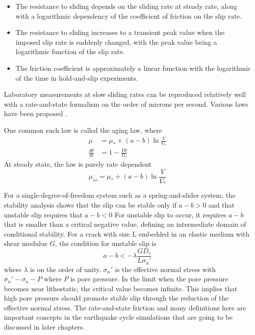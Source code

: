 \begin{itemize}
    \item The resistance to sliding depends on the sliding rate at steady rate, along with a logarithmic dependency of the coefficient of friction on the slip rate.
    \item The resistance to sliding increases to a transient peak value when the imposed slip rate is suddenly changed, with the peak value being a logarithmic function of the slip rate.
    \item The friction coefficient is approximately a linear function with the logarithmic of the time in hold-and-slip experiments.
\end{itemize}

Laboratory measurements at slow sliding rates can be reproduced relatively well with a rate-and-state formalism on the order of microns per second.
Various laws have been proposed \citep{https://doi.org/10.1029/JB084iB05p02161, https://doi.org/10.1029/JB084iB05p02169,https://doi.org/10.1029/JB088iB12p10359,annurev:/content/journals/10.1146/annurev.earth.26.1.643}.

One common such law is called the aging law, where
\begin{align}
    \mu &= \mu_* + (a - b) \ln \frac{V}{V_*} \\
    \frac{d\theta}{dt} &= 1 - \frac{V\theta}{D_c}
\end{align}
At steady state, the law is purely rate dependent
\begin{equation}
    \mu_{ss} = \mu_{*} + (a - b) \ln \frac{V}{V_*}
\end{equation}

For a single-degree-of-freedom system such as a spring-and-slider system, the stability analysis shows that the slip can be stable only if $a - b > 0$ and that unstable slip requires that $a - b < 0$  
For unstable slip to occur, it requires $a - b$ that is smaller than a critical negative value, defining an intermediate domain of conditional stability.
For a crack with size L embedded in an elastic medium with shear modulus $G$, the condition for unstable slip is 
\begin{equation}
    a - b < - \lambda \frac{GD_c}{L\sigma_n'}
\end{equation}
where $\lambda$ is on the order of unity. 
$\sigma_n'$ is the effective normal stress with $\sigma_n' - \sigma_n - P$ where $P$ is pore pressure.
In the limit when the pore pressure becomes near lithostatic, the critical value becomes infinite.
This implies that high pore pressure should promote stable slip through the reduction of the effective normal stress.
The rate-and-state friction and many definitions here are important concepts in the earthquake cycle simulations that are going to be discussed in later chapters.

\citep{}